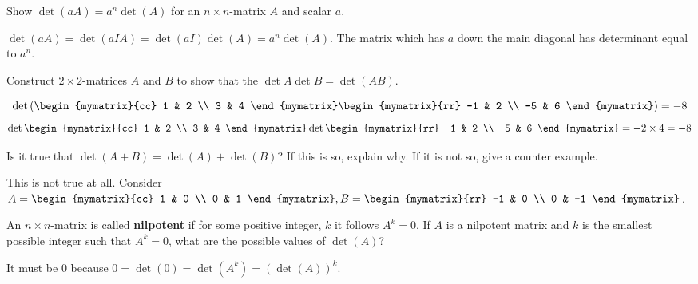 \begin{enumialphparenastyle}
\begin{ex} Show $\det (aA) =a^{n}\det (A) $ for an $n \times n $-matrix $A
$ and scalar $a$. 
\begin{sol}
$\det (aA) =\det
(aIA) =\det (aI) \det (A) =a^{n}\det
(A)$. The matrix which has $a$ down the main diagonal has
determinant equal to $a^{n}$.
\end{sol}
\end{ex}


\begin{ex} Construct $2\times 2$-matrices $A$ and $B$ to show that the
$\det A \det B = \det (AB)$. 
\begin{sol}
\begin{equation*}
\det
\paren{\begin{mymatrix}{cc}
1 & 2 \\
3 & 4
\end{mymatrix} \begin{mymatrix}{rr}
-1 & 2 \\
-5 & 6
\end{mymatrix}} = -8
\end{equation*}
\begin{equation*}
\det \begin{mymatrix}{cc}
1 & 2 \\
3 & 4
\end{mymatrix} \det \begin{mymatrix}{rr}
-1 & 2 \\
-5 & 6
\end{mymatrix} = -2 \times 4 = -8
\end{equation*}
\end{sol}
\end{ex}

\begin{ex} Is it true that $\det (A+B) =\det (A) +\det
(B)$? If this is so, explain why. If it is not so,
give a counter example.  
\begin{sol}
This is not true at all. Consider $A=\begin{mymatrix}{cc}
1 & 0 \\
0 & 1
\end{mymatrix} ,B=\begin{mymatrix}{rr}
-1 & 0 \\
0 & -1
\end{mymatrix}$.
\end{sol}
\end{ex}

\begin{ex} An $n\times n$-matrix is called \textbf{nilpotent}
 if for some positive integer, $k$ it follows $A^{k}=0$. If
$A$ is a nilpotent matrix and $k$ is the smallest possible integer such that
$A^{k}=0$, what are the possible values of $\det (A)$? 
\begin{sol}
It must
be 0 because $0=\det (0) =\det (A^{k}) =(\det
(A)) ^{k}$.
\end{sol}
\end{ex}


\end{enumialphparenastyle}
